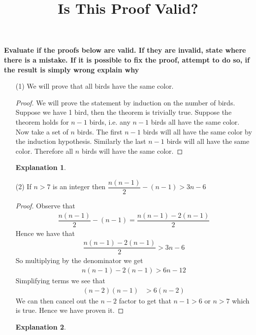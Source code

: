 \documentclass[12pt]{article}
\theoremstyle{plain}
\theoremstyle{plain}
\theoremstyle{definition}
\newtheorem*{remark}{Explanation}
\begin{document}
 
\title{Is This Proof Valid?}
\date{}
\maketitle 


\noindent \textbf{Evaluate if the proofs below are valid. If they are invalid, state where there is a mistake. If it is possible to fix the proof, attempt to do so, if the result is simply wrong explain why} \\
 \begin{enumerate}
    \item [(1)] We will prove that all birds have the same color. \begin{proof}
        We will prove the statement by induction on the number of birds. Suppose we have 1 bird, then the theorem is trivially true. Suppose the theorem holds for \(n-1\) birds, i.e. any \(n-1\) birds all have the same color. Now take a set of \(n\) birds. The first \(n-1\) birds will all have the same color by the induction hypothesis. Similarly the last \(n-1\) birds will all have the same color. Therefore all \(n\) birds will have the same color.
    \end{proof}
    \begin{remark}
    \end{remark}
    \item [(2)] If \(n > 7 \) is an integer then \(\dfrac{n(n-1)}{2} - (n-1) > 3n - 6 \) \begin{proof}
        Observe that  \begin{align*}
           \dfrac{n(n-1)}{2} - (n-1) = \dfrac{n(n-1) -2(n-1)}{2} 
        \end{align*}
        Hence we have that \begin{align*}
            \dfrac{n(n-1) -2(n-1)}{2}  > 3n - 6 
            \end{align*}
            So multiplying by the denominator we get \begin{align*}
           n(n-1) - 2(n-1)  > 6n - 12
        \end{align*}
        Simplifying terms we see that \begin{align*}
            (n-2)(n-1) & > 6(n-2)
        \end{align*}
        We can then cancel out the \(n-2\) factor to get that \(n- 1 > 6\) or \(n >7\) which is true. Hence we have proven it.
    \end{proof}
    \begin{remark}

\end{remark}
\end{enumerate}
\end{document}
